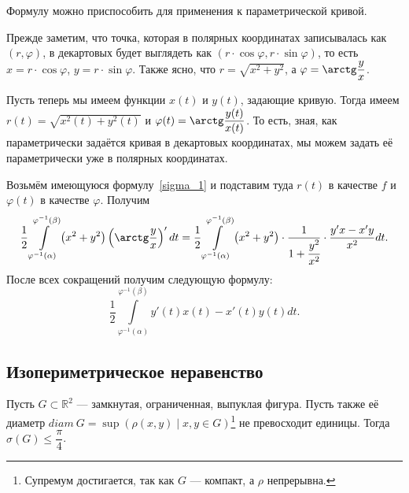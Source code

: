 \begin{remark}
	Формулу можно приспособить для применения к параметрической кривой.
	
	Прежде заметим, что точка, которая в полярных координатах записывалась как \((r, \varphi)\), в декартовых будет выглядеть как \((r \cdot \cos \varphi, r \cdot \sin \varphi)\), то есть \(x = r \cdot \cos \varphi\), \(y = r \cdot \sin \varphi\). Также ясно, что \(r = \sqrt{x^2 + y^2}\), а \(\varphi = \arctg \dfrac{y}{x}\).
	
	Пусть теперь мы имеем функции \(x(t)\) и \(y(t)\), задающие кривую. Тогда имеем \(r(t) = \sqrt{x^2(t) + y^2(t)}\) и \(\varphi(t) = \arctg \dfrac{y(t)}{x(t)}\). То есть, зная, как параметрически задаётся кривая в декартовых координатах, мы можем задать её параметрически уже в полярных координатах.
	
	Возьмём имеющуюся формулу~\eqref{sigma_1} и подставим туда \(r(t)\) в качестве \(f\) и \(\varphi(t)\) в качестве \(\varphi\).  Получим \[
	\frac{1}{2}\int\limits_{\varphi^{-1}(\alpha)}^{\varphi^{-1}(\beta)} \left(x^2 + y^2 \right) \left(\arctg \frac{y}{x}\right)' dt
	= \frac{1}{2}\int\limits_{\varphi^{-1}(\alpha)}^{\varphi^{-1}(\beta)} \left(x^2 + y^2 \right) \cdot \frac{1}{1 + \cfrac{y^2}{x^2}} \cdot \frac{y'x - x'y}{x^2} dt.
	\]
	После всех сокращений получим следующую формулу: \[
	\frac{1}{2}\int\limits_{\varphi^{-1}(\alpha)}^{\varphi^{-1}(\beta)} y'(t)x(t) - x'(t)y(t) dt.
	\]
\end{remark}

\subsection{Изопериметрическое неравенство}

\begin{example}
	Пусть \(G \subset \mathbb{R}^2\) --- замкнутая, ограниченная, выпуклая фигура. Пусть также её диаметр \(diam \ G = \sup \left(\rho(x, y) \mid x, y \in G \right)\)\footnote{Супремум достигается, так как \(G\) --- компакт, а \(\rho\) непрерывна.} не превосходит единицы. Тогда \(\sigma(G) \leqslant \dfrac{\pi}{4}\).
\end{example}

